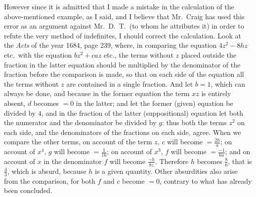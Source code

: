\documentclass[polutonikogreek,english,twoside,openright]{article}
\begin{document}
However since it is admitted that I made a mistake in the calculation
of the above-mentioned example, as I said, and I believe that Mr.\
Craig has used this error as an argument against Mr.\ D.\ T.\ (to whom
he attributes it) in order to refute the very method of indefinites, I
should correct the calculation.  Look at the {\em Acts} of the year
1684, page 239, where, in comparing the equation $4z^2-8hz$ etc.\ with
the equation $bz^2+caz$ etc., the terms without $z$ placed outside the
fraction in the latter equation should be multiplied by the
denominator of the fraction before the comparison is made, so that on
each side of the equation all the terms without $z$ are contained in a
single fraction.  And let $b=1$, which can always be done, and because
in the former equation the term $xz$ is entirely absent, $d$ becomes
$=0$ in the latter; and let the former (given) equation be divided by
$4$, and in the fraction of the latter (suppositional) equation let
both the numerator and the denominator be divided by $g$: thus both
the terms $z^2$ on each side, and the denominators of the fractions on
each side, agree.  When we compare the other terms, on account of the
term $z$, $c$ will become $= \frac{2h}{a}$; on account of $x^4$, $g$
will become $=\frac{1}{16}$; on account of $x^3$, $f$ will become
$= \frac{-1}{6a}$; and on account of $x$ in the denominator $f$ will
become $\frac{-h}{8z}$.  Therefore $h$ becomes $\frac{8}{6}$, that is
$\frac{4}{3}$, which is absurd, because $h$ is a given quantity.
Other absurdities also arise from the comparison, for both $f$ and $c$
become $=0$, contrary to what has already been concluded.
\end{document}
